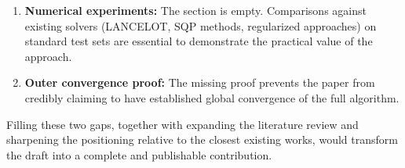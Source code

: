 \documentclass[11pt]{article}
\theoremstyle{plain}
\begin{document}
\begin{enumerate}[label=(\roman*)]
  \item \textbf{Numerical experiments:} The section is empty. Comparisons against existing solvers (LANCELOT, SQP methods, regularized approaches) on standard test sets are essential to demonstrate the practical value of the approach.
  \item \textbf{Outer convergence proof:} The missing proof prevents the paper from credibly claiming to have established global convergence of the full algorithm.
\end{enumerate}

\noindent Filling these two gaps, together with expanding the literature review and sharpening the positioning relative to the closest existing works, would transform the draft into a complete and publishable contribution.
\end{document}
